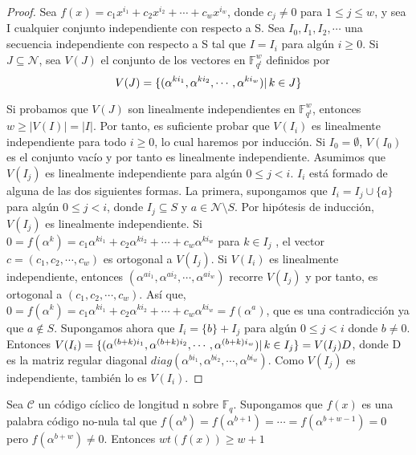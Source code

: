 \begin{proof}
Sea $f(x) = c_1x^{i_1} + c_2x^{i_2} + \cdots + c_wx^{i_w}$, donde $c_j \neq 0$ para $1 \leq j \leq w$, y sea I cualquier conjunto independiente con respecto a S. Sea $I_0,I_1,I_2, \cdots$ una secuencia independiente con respecto a S tal que $I = I_i$ para algún $i \geq 0$. Si $ J \subseteq \mathcal{N}$, sea $V(J)$ el conjunto de los vectores en $\mathbb{F}_{q^t}^w$ definidos por 
\[ 
V(J) = \{ (\alpha^{ki_1},\alpha^{ki_2}, \cdots, \alpha^{ki_w}) | \thinspace k \in J \}
\]

Si probamos que $V(J)$ son linealmente independientes en $\mathbb{F}_{q^t}^w$, entonces $w \geq |V(I)| = |I|$. Por tanto, es suficiente probar que $V(I_i)$ es linealmente independiente para todo $i \geq 0$, lo cual haremos por inducción. Si $I_0 = \emptyset$, $V(I_0)$ es el conjunto vacío y por tanto es linealmente independiente. Asumimos que $V(I_j)$ es linealmente independiente para algún $0 \leq j < i$. $I_i$ está formado de alguna de las dos siguientes formas. La primera, supongamos que $I_i = I_j \cup \{ a \}$ para algún $0 \leq j < i$, donde $I_j \subseteq S$ y $a \in \mathcal{N}\setminus S$. Por hipótesis de inducción, $V(I_j)$ es linealmente independiente. Si $ 0 = f(\alpha^k) = c_1\alpha^{ki_1} + c_2\alpha^{ki_2} + \cdots + c_w\alpha^{ki_w} $ para $k \in I_j$ , el vector $c = ( c_1, c_2 , \cdots , c_w ) $ es ortogonal a $V(I_j)$. Si $V(I_i)$ es linealmente independiente, entonces $(\alpha^{ai_1},\alpha^{ai_2}, \cdots, \alpha^{ai_w})$ recorre $V(I_j)$ y por tanto, es ortogonal a $(c_1,c_2, \cdots, c_w)$. Así que, $ 0 = f(\alpha^k) = c_1\alpha^{ki_1} + c_2\alpha^{ki_2} + \cdots + c_w\alpha^{ki_w} = f(\alpha^a)$, que es una contradicción ya que $a \not\in S$. Supongamos ahora que $I_i = \{ b \} + I_j$ para algún $0 \leq j < i$ donde $ b \neq 0 $. Entonces $V(I_i) =  \{ (\alpha^{(b+k)i_1},\alpha^{(b+k)i_2}, \cdots, \alpha^{(b+k)i_w}) | \thinspace k \in I_j \} = V(I_j)D$, donde D es la matriz regular diagonal $diag(\alpha^{bi_1},\alpha^{bi_2}, \cdots, \alpha^{bi_w})$. Como $V(I_j)$ es independiente, también lo es $V(I_i)$.
\end{proof}


\begin{corollary}
Sea $\mathcal{C}$ un código cíclico de longitud n sobre $\mathbb{F}_q$. Supongamos que $f(x)$ es una palabra código no-nula tal que $f(\alpha^b) = f(\alpha^{b+1}) = \cdots = f(\alpha^{b+w-1}) = 0$ pero $f(\alpha^{b+w}) \neq 0 $. Entonces $ wt(f(x)) \geq w +1 $
\end{corollary}

